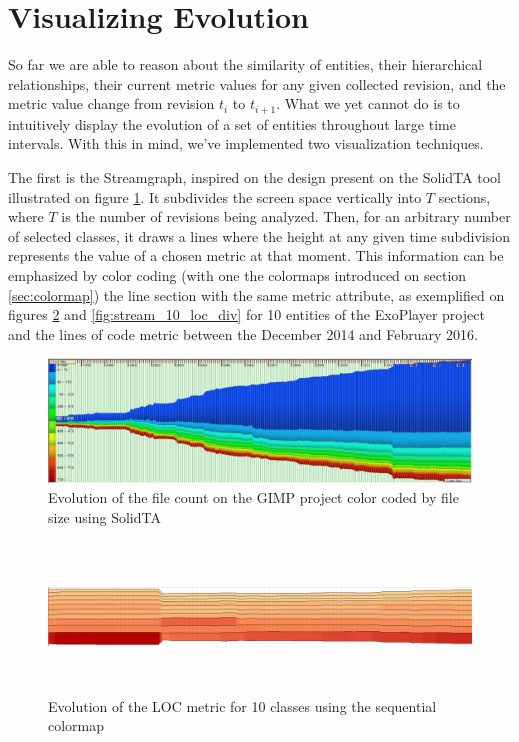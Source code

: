 \section{Visualizing Evolution} \label{sec:evolution}
So far we are able to reason about the similarity of entities, their hierarchical relationships, their current metric values for any given collected revision, and the metric value change from revision $t_{i}$ to $t_{i+1}$. What we yet cannot do is to intuitively display the evolution of a set of entities throughout large time intervals. With this in mind, we've implemented two visualization techniques.

The first is the Streamgraph, inspired on the design present on the SolidTA tool \cite{ref:solid} illustrated on figure \ref{fig:flow_solid}. It subdivides the screen space vertically into $T$ sections, where $T$ is the number of revisions being analyzed. Then, for an arbitrary number of selected classes, it draws a lines where the height at any given time subdivision represents the  value of a chosen metric at that moment. This information can be emphasized by color coding (with one the colormaps introduced on section \ref{sec:colormap}) the line section with the same metric attribute, as exemplified on figures \ref{fig:stream_10_loc} and \ref{fig:stream_10_loc_div} for 10 entities of the ExoPlayer project and the lines of code metric between the December 2014 and February 2016.

\begin{figure}[H]
	\centering
	\includegraphics[width=1.0\textwidth]{figures/flow_graph.png}
	\caption{Evolution of the file count on the GIMP project color coded by file size using SolidTA}
	\label{fig:flow_solid}
\end{figure}


\begin{figure}[H]
	\centering
	\includegraphics[width=1.0\textwidth,height=4.0cm]{figures/stream_10_loc.png}
	\caption{Evolution of the LOC metric for 10 classes using the sequential colormap}
	\label{fig:stream_10_loc}
\end{figure}

